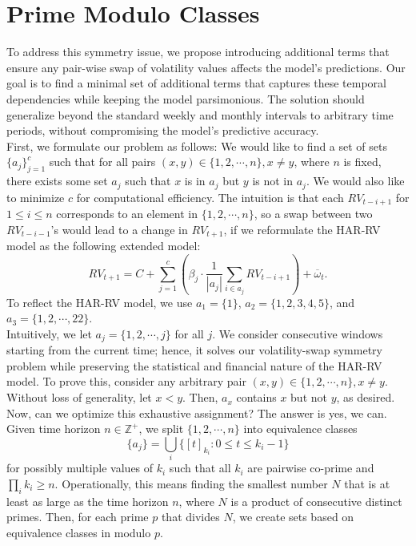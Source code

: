 \documentclass[11pt,a4paper]{article}
\begin{document}
\section{Prime Modulo Classes}
\noindent To address this symmetry issue, we propose introducing additional terms that ensure any pair-wise swap of volatility values affects the model's predictions. Our goal is to find a minimal set of additional terms that captures these temporal dependencies while keeping the model parsimonious. The solution should generalize beyond the standard weekly and monthly intervals to arbitrary time periods, without compromising the model's predictive accuracy.
\vspace{0.3cm}
\\ First, we formulate our problem as follows: We would like to find a set of sets $\{a_j\}_{j=1}^c$ such that for all pairs $(x, y) \in \{1, 2, \cdots, n\}, x \neq y$, where $n$ is fixed, there exists some set $a_j$ such that $x$ is in $a_j$ but $y$ is not in $a_j$. We would also like to minimize $c$ for computational efficiency. The intuition is that each $RV_{t-i+1}$ for $1 \leq i \leq n$ corresponds to an element in $\{1, 2, \cdots, n\}$, so a swap between two $RV_{t-i-1}$'s would lead to a change in $RV_{t+1}$, if we reformulate the HAR-RV model as the following extended model: $$RV_{t+1} = C + \sum_{j = 1}^c\left(\beta_j \cdot \frac{1}{|a_j|} \sum_{i \in a_j} RV_{t-i+1}\right) + \overline{\omega}_t.$$ To reflect the HAR-RV model, we use $a_1 = \{1\}$, $a_2 = \{1, 2, 3, 4, 5\}$, and $a_3 = \{1, 2, \cdots, 22\}$.
\vspace{0.3cm}
\\ Intuitively, we let $a_j = \{1, 2, \cdots, j\}$ for all $j$. We consider consecutive windows starting from the current time; hence, it solves our volatility-swap symmetry problem while preserving the statistical and financial nature of the HAR-RV model. To prove this, consider any arbitrary pair $(x, y) \in \{1, 2, \cdots, n\}, x \neq y$. Without loss of generality, let $x<y$. Then, $a_x$ contains $x$ but not $y$, as desired. Now, can we optimize this exhaustive assignment? The answer is yes, we can.
\vspace{0.3cm}
\\ Given time horizon $n\in \mathbb{Z}^+$, we split $\{1, 2, \cdots, n\}$ into equivalence classes $$\{a_j\} = \bigcup_{i} \{[t]_{k_i}: 0 \leq t \leq k_i-1\}$$ for possibly multiple values of $k_i$ such that all $k_i$ are pairwise co-prime and $\displaystyle\prod_i k_i \geq n$. Operationally, this means finding the smallest number $N$ that is at least as large as the time horizon $n$, where $N$ is a product of consecutive distinct primes. Then, for each prime $p$ that divides $N$, we create sets based on equivalence classes in modulo $p$.
\end{document}
